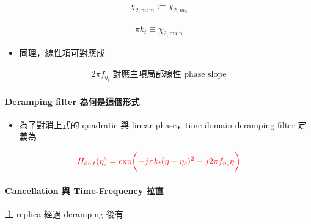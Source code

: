 \documentclass[11pt]{article}
\providecommand{\tightlist}{%
  \setlength{\itemsep}{0pt}\setlength{\parskip}{0pt}}
\begin{document}
\begin{equation}
\begin{aligned}
\chi_{2,\mathrm{main}}:=\chi_{2,m_0}
\end{aligned}
\end{equation}

\begin{equation}
\begin{aligned}
\pi k_t \equiv \chi_{2,\mathrm{main}}
\end{aligned}
\end{equation}

\begin{itemize}
\tightlist
\item
  同理，線性項可對應成
\end{itemize}

\begin{equation}
\begin{aligned}
2\pi f_{\eta_c}\;\text{對應主項局部線性 phase slope}
\end{aligned}
\end{equation}

\hypertarget{deramping-filter-ux70baux4f55ux662fux9019ux500bux5f62ux5f0f}{%
\paragraph{Deramping filter
為何是這個形式}\label{deramping-filter-ux70baux4f55ux662fux9019ux500bux5f62ux5f0f}}

\begin{itemize}
\tightlist
\item
  為了對消上式的 quadratic 與 linear phase，time-domain deramping filter
  定義為
\end{itemize}

\begin{equation}
\begin{aligned}
{\color{red}{H_{\mathrm{de},t}(\eta) = \exp\biggl( -j\pi k_t(\eta-\eta_c)^2 - j2\pi f_{\eta_c}\eta \biggr)}}
\end{aligned}
\end{equation}

\hypertarget{cancellation-ux8207-time-frequency-ux62c9ux76f4}{%
\paragraph{Cancellation 與 Time-Frequency
拉直}\label{cancellation-ux8207-time-frequency-ux62c9ux76f4}}

主 replica 經過 deramping 後有
\end{document}
